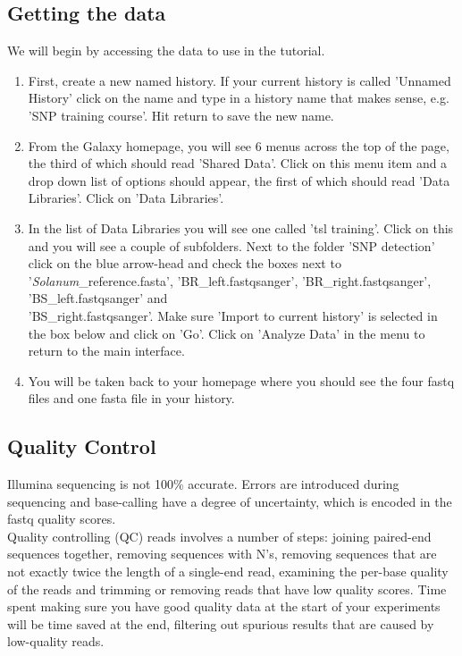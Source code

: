 \documentclass[12pt,a4paper]{article}
\begin{document}
\subsection{Getting the data}

We will begin by accessing the data to use in the tutorial.
\begin{enumerate}
	\item First, create a new named history. If your current
          history is called 'Unnamed History' click on the name and
          type in a history name that makes sense, e.g. 'SNP training
          course'. Hit return to save the new name.
	\item From the Galaxy homepage, you will see 6 menus across
          the top of the page, the third of which should read 'Shared
          Data'. Click on this menu item and a drop down list of
          options should appear, the first of which should read 'Data
          Libraries'. Click on 'Data Libraries'.
	\item In the list of Data Libraries you will see one called
          'tsl training'. Click on this and you will see a couple of
          subfolders. Next to the folder 'SNP detection' click on the
          blue arrow-head and check the boxes next to
          '\emph{Solanum}\_reference.fasta', 'BR\_left.fastqsanger',
          'BR\_right.fastqsanger', 'BS\_left.fastqsanger' and\\
          'BS\_right.fastqsanger'. Make sure 'Import to current
          history' is selected in the box below and click on
          'Go'. Click on 'Analyze Data' in the menu to return to the
          main interface.
	\item You will be taken back to your homepage where you should
          see the four fastq files and one fasta file in your history.
\end{enumerate}

\subsection{Quality Control}

Illumina sequencing is not 100\% accurate. Errors are introduced
during sequencing and base-calling have a degree of uncertainty, which
is encoded in the fastq quality scores.  \\

Quality controlling (QC) reads involves a number of steps: joining
paired-end sequences together, removing sequences with N's, removing
sequences that are not exactly twice the length of a single-end read,
examining the per-base quality of the reads and trimming or removing
reads that have low quality scores. Time spent making sure you have
good quality data at the start of your experiments will be time saved
at the end, filtering out spurious results that are caused by
low-quality reads.  \\ 
\end{document}
